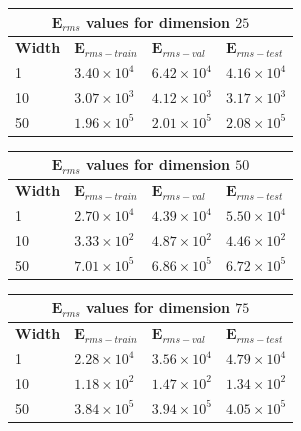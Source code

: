 {
\begin{table}[hptb]
\begin{tabular}{ |p{1.5cm}|p{3cm}|p{3cm}| p{3cm}|  }
\hline
\multicolumn{4}{|c|}{$\mathbf{E}_{rms}$ values for dimension $25$ } \\
\hline
\rowcolor{lightgray} \textbf{Width} & $\mathbf{E}_{rms-train}$ & $\mathbf{E}_{rms-val}$ & $\mathbf{E}_{rms-test}$ \\
\hline
  1   &   $3.40 \times 10^4$   &  $6.42 \times 10^4 $        &     $4.16 \times 10^4 $   \\
 \hline
 10   &   $3.07 \times 10^3$  &  $4.12 \times 10^3 $          &     $3.17 \times 10^3 $   \\
 \hline
 50   &   $1.96 \times 10^5$  & $2.01 \times 10^5$          &         $2.08 \times 10^5$   \\
\hline
\end{tabular}
\label{table:8}
\end{table}
}
{
\begin{table}[hptb]
\begin{tabular}{ |p{1.5cm}|p{3cm}|p{3cm}| p{3cm}|  }
\hline
\multicolumn{4}{|c|}{$\mathbf{E}_{rms}$ values for dimension $50$ } \\
\hline
\rowcolor{lightgray} \textbf{Width} & $\mathbf{E}_{rms-train}$ & $\mathbf{E}_{rms-val}$ & $\mathbf{E}_{rms-test}$ \\
\hline
  1   &   $2.70 \times 10^4$   &  $4.39 \times 10^4 $        &     $5.50 \times 10^4 $   \\
 \hline
 10   &   $3.33 \times 10^2$  &  $4.87 \times 10^2 $          &     $4.46 \times 10^2 $   \\
 \hline
 50   &   $7.01 \times 10^5$  & $6.86 \times 10^5$          &         $6.72 \times 10^5$   \\
\hline
\end{tabular}
\label{table:8}
\end{table}
}
{
\begin{table}[hptb]
\begin{tabular}{ |p{1.5cm}|p{3cm}|p{3cm}| p{3cm}|  }
\hline
\multicolumn{4}{|c|}{$\mathbf{E}_{rms}$ values for dimension $75$ } \\
\hline
\rowcolor{lightgray} \textbf{Width} & $\mathbf{E}_{rms-train}$ & $\mathbf{E}_{rms-val}$ & $\mathbf{E}_{rms-test}$ \\
\hline
  1   &   $2.28 \times 10^4$   &  $3.56 \times 10^4 $        &     $4.79 \times 10^4 $   \\
 \hline
 10   &   $1.18 \times 10^2$  &  $1.47 \times 10^2 $          &     $1.34 \times 10^2 $   \\
 \hline
 50   &   $3.84 \times 10^5$  & $3.94 \times 10^5$          &         $4.05 \times 10^5$   \\
\hline
\end{tabular}
\label{table:8}
\end{table}
}
